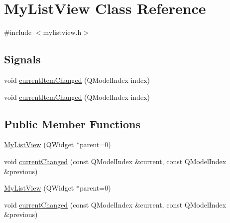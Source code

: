 \hypertarget{class_my_list_view}{
\section{MyListView Class Reference}
\label{class_my_list_view}
}


{\ttfamily \#include $<$mylistview.h$>$}

\subsection*{Signals}
\begin{DoxyCompactItemize}
\item 
void \hyperlink{class_my_list_view_ad66b90ffd50ae8cfed503fe9017bb611}{currentItemChanged} (QModelIndex index)
\item 
void \hyperlink{class_my_list_view_ad66b90ffd50ae8cfed503fe9017bb611}{currentItemChanged} (QModelIndex index)
\end{DoxyCompactItemize}
\subsection*{Public Member Functions}
\begin{DoxyCompactItemize}
\item 
\hyperlink{class_my_list_view_ad4f6834cb99ca66c79423d878fb44011}{MyListView} (QWidget $\ast$parent=0)
\item 
void \hyperlink{class_my_list_view_a40e662fe13afd90e6e35dd66be190f56}{currentChanged} (const QModelIndex \&current, const QModelIndex \&previous)
\item 
\hyperlink{class_my_list_view_ad4f6834cb99ca66c79423d878fb44011}{MyListView} (QWidget $\ast$parent=0)
\item 
void \hyperlink{class_my_list_view_a40e662fe13afd90e6e35dd66be190f56}{currentChanged} (const QModelIndex \&current, const QModelIndex \&previous)
\end{DoxyCompactItemize}


